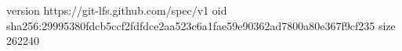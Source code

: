 version https://git-lfs.github.com/spec/v1
oid sha256:29995380fdcb5ccf2fdfdce2aa523c6a1fae59e90362ad7800a80e367f9cf235
size 262240

